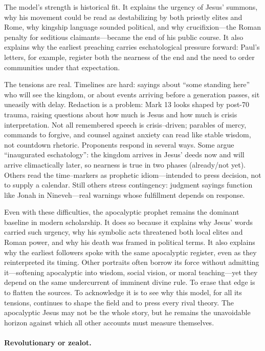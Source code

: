 The model’s strength is historical fit.
It explains the urgency of Jesus’ summons, why his movement could be read as destabilizing by both priestly elites and Rome, why kingship language sounded political, and why crucifixion—the Roman penalty for seditious claimants—became the end of his public course.
It also explains why the earliest preaching carries eschatological pressure forward: Paul’s letters, for example, register both the nearness of the end and the need to order communities under that expectation.

The tensions are real.
Timelines are hard: sayings about “some standing here” who will see the kingdom, or about events arriving before a generation passes, sit uneasily with delay.
Redaction is a problem: Mark 13 looks shaped by post-70 trauma, raising questions about how much is Jesus and how much is crisis interpretation.
Not all remembered speech is crisis–driven; parables of mercy, commands to forgive, and counsel against anxiety can read like stable wisdom, not countdown rhetoric.
Proponents respond in several ways.
Some argue “inaugurated eschatology”: the kingdom arrives in Jesus’ deeds now and will arrive climactically later, so nearness is true in two phases (already/not yet).
Others read the time–markers as prophetic idiom—intended to press decision, not to supply a calendar.
Still others stress contingency: judgment sayings function like Jonah in Nineveh—real warnings whose fulfillment depends on response.

Even with these difficulties, the apocalyptic prophet remains the dominant baseline in modern scholarship.
It does so because it explains why Jesus’ words carried such urgency, why his symbolic acts threatened both local elites and Roman power, and why his death was framed in political terms.
It also explains why the earliest followers spoke with the same apocalyptic register, even as they reinterpreted its timing.
Other portraits often borrow its force without admitting it—softening apocalyptic into wisdom, social vision, or moral teaching—yet they depend on the same undercurrent of imminent divine rule.
To erase that edge is to flatten the sources.
To acknowledge it is to see why this model, for all its tensions, continues to shape the field and to press every rival theory.
The apocalyptic Jesus may not be the whole story, but he remains the unavoidable horizon against which all other accounts must measure themselves.

\paragraph{Revolutionary or zealot.}

